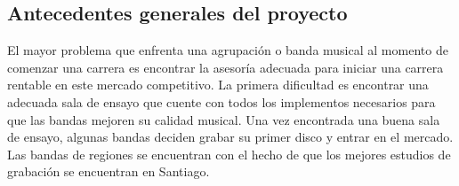 	
	


\subsection{Antecedentes generales del proyecto}

El mayor problema que enfrenta una agrupación o banda musical al momento
de comenzar una carrera es encontrar la asesoría adecuada para iniciar
una carrera rentable en este mercado competitivo. La primera dificultad
es encontrar una adecuada sala de ensayo que cuente con todos los 
implementos necesarios para que las bandas mejoren su calidad musical. 
Una vez encontrada una buena sala de ensayo, algunas bandas deciden grabar
su primer disco y entrar en el mercado. Las bandas de regiones se encuentran
con el hecho de que los mejores estudios de grabación se encuentran en Santiago.

